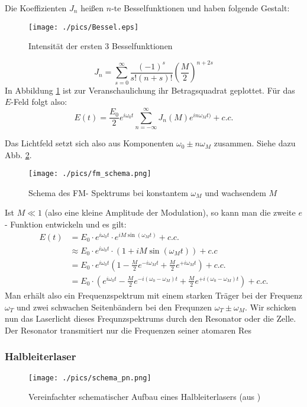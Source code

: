 \documentclass[a4paper,oneside]{article}
\begin{document}
Die Koeffizienten $J_n$ heißen $n$-te Besselfunktionen und haben folgende Gestalt:

\begin{figure}[!htb]
 \centering
 \texttt{[image: ./pics/Bessel.eps]}
 \caption{Intensität der ersten 3 Besselfunktionen}
 \label{bessel}
\end{figure}


\begin{equation}
 J_n=\sum_{s=0}^\infty \frac{(-1)^s}{s!(n+s)!}\left(\frac{M}{2}\right)^{n+2s}
\end{equation}
In Abbildung \ref{bessel} ist zur Veranschaulichung ihr Betragsquadrat geplottet.
Für das $E$-Feld folgt also:
\begin{equation}
 E(t)=\frac{E_0}{2}e^{i\omega_0t}\sum_{n=-\infty}^\infty J_n(M) e^{in\omega_Mt)}+c.c.
\end{equation}

Das Lichtfeld setzt sich also aus Komponenten $\omega_0\pm n\omega_M$ zusammen. Siehe dazu Abb. \ref{schema_fm}.
\begin{figure}[!htb]
 \centering
 \texttt{[image: ./pics/fm\_schema.png]}
 \caption[FM- Spektrum]{Schema des FM- Spektrums bei konstantem $\omega_M$ und wachsendem $M$}
 \label{schema_fm}
\end{figure}
Ist $M\ll1$ (also eine kleine Amplitude der Modulation), so kann man die zweite $e$- Funktion entwickeln und es gilt:
\begin{align}
 E(t)&=E_0\cdot e^{i\omega_0 t}\cdot e^{iM\sin(\omega_M t)}+c.c.\nonumber\\
&\approx E_0\cdot e^{i\omega_0 t}\cdot(1+iM\sin(\omega_M t))+c.c\nonumber\\
&=E_0\cdot e^{i\omega_0 t}(1-\frac{M}{2}e^{-i\omega_Mt}+\frac{M}{2}e^{+i\omega_Mt})+c.c.\nonumber\\
&=E_0\cdot(e^{i\omega_0 t}-\frac{M}{2}e^{-i(\omega_0-\omega_M)t}+\frac{M}{2}e^{+i(\omega_0-\omega_M)t})+c.c.
\end{align}
Man erhält also ein Frequenzspektrum mit einem starken Träger bei der Frequenz $\omega_T$ und zwei schwachen Seitenbändern bei den Frequnzen $\omega_T\pm\omega_M$. Wir schicken nun das Laserlicht dieses Frequnzspektrums durch den Resonator oder die Zelle. Der Resonator transmitiert nur die Frequenzen seiner atomaren Res

\subsubsection{Halbleiterlaser}
\begin{figure}[!htb]
 \centering
 \texttt{[image: ./pics/schema\_pn.png]}
 \caption[Halbleiterlaser]{Vereinfachter schematischer Aufbau eines Halbleiterlasers (aus \cite{dem3})}
 \label{schema_pn}
\end{figure}
\end{document}
